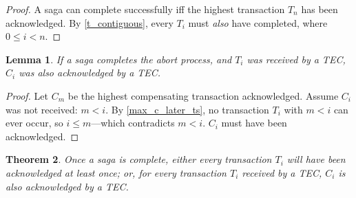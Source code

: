 \documentclass{article}
\newtheorem{theorem}{Theorem}[section]
\newtheorem{lemma}[theorem]{Lemma}
\begin{document}
\begin{proof}

A saga can complete successfully iff the highest transaction $T_n$ has been
acknowledged. By \ref{t_contiguous}, every $T_i$ must \textit{also} have
completed, where $0 \le i < n$.

\end{proof}


\begin{lemma}
\label{abort_corresponding_cs}
If a saga completes the abort process, and $T_i$ was received by a TEC, $C_i$
was also acknowledged by a TEC.
\end{lemma}

\begin{proof}

Let $C_{m}$ be the highest compensating transaction acknowledged. Assume $C_i$
was not received: $m < i$. By \ref{max_c_later_ts}, no transaction $T_i$ with
$m < i$ can ever occur, so $i \le m$---which contradicts $m < i$. $C_i$ must
have been acknowledged.

\end{proof}


\begin{theorem}
\label{all_ts_or_corresponding_cs}
Once a saga is complete, either every transaction $T_i$ will have been acknowledged at least once; or, for every transaction $T_i$ received by a TEC, $C_i$ is also acknowledged by a TEC.
\end{theorem}
\end{document}
